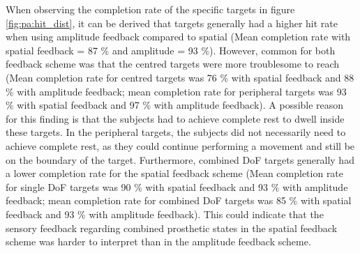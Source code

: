 When observing the completion rate of the specific targets in figure \ref{fig:pa:hit_dist}, it can be derived that targets generally had a higher hit rate when using amplitude feedback compared to spatial (Mean completion rate with spatial feedback = 87 \% and amplitude = 93 \%). However, common for both feedback scheme was that the centred targets were more troublesome to reach (Mean completion rate for centred targets was 76 \% with spatial feedback and 88 \% with amplitude feedback; mean completion rate for peripheral targets was 93 \% with spatial feedback and 97 \% with amplitude feedback). A possible reason for this finding is that the subjects had to achieve complete rest to dwell inside these targets. In the peripheral targets, the subjects did not necessarily need to achieve complete rest, as they could continue performing a movement and still be on the boundary of the target. Furthermore, combined DoF targets generally had a lower completion rate for the spatial feedback scheme (Mean completion rate for single DoF targets was 90 \% with spatial feedback and 93 \% with amplitude feedback; mean completion rate for combined DoF targets was 85 \% with spatial feedback and 93 \% with amplitude feedback). This could indicate that the sensory feedback regarding combined prosthetic states in the spatial feedback scheme was harder to interpret than in the amplitude feedback scheme. 


